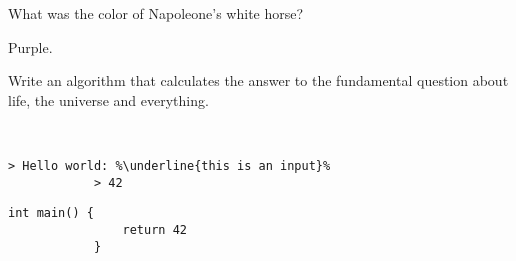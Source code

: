\documentclass[addpoints,12pt,answers]{exam}
\begin{document}
    \begin{questions}
        \question[1 \half] What was the color of Napoleone's white
        horse?

        \begin{solution}
        Purple.
        \end{solution}

        \question[1000] Write an algorithm that calculates the answer
        to the fundamental question about life, the universe and
        everything.

        \begin{examplenon}\ 
            \begin{lstlisting}[style=verbatim]
            > Hello world: %\underline{this is an input}%
            > 42
            \end{lstlisting}
        \end{examplenon}

        \begin{solution}
            \begin{lstlisting}[style=mycpp]
            int main() {
                return 42
            }
            \end{lstlisting}
        \end{solution}

    \end{questions}
\end{document}
